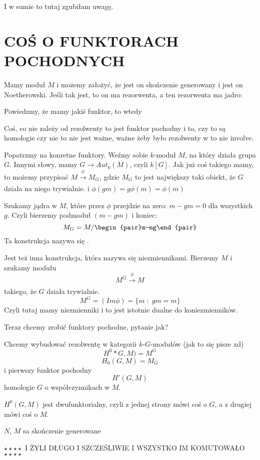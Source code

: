 \documentclass{article}
\begin{document}
I w sumie to tutaj zgubiłam uwagę.


\section*{COŚ O FUNKTORACH POCHODNYCH}

Mamy moduł $M$ i możemy założyć, że jest on skończenie generowany i jest on Noetherowski. Jeśli tak jest, to on ma rezorwenta, a ten rezorwenta ma jadro:

Powiedzmy, że mamy jakiś funktor, to wtedy


Coś, co nie zależy od rezolwenty to jest funktor pochodny i to, czy to są homologie czy nie to nie jest ważne, ważne żeby było rezolwenty w to nie involve.

Popatrzmy na konretne funktory. Weźmy sobie $k$-moduł $M$, na który działa grupa $G$. Innymi słowy, mamy $G\to Aut_k(M)$, czyli $k[G]$.
Jak już coś takiego mamy, to możemy przypisać
$M\xrightarrow[]{\phi} M_G$, gdzie $M_G$ to jest największy taki obiekt, że $G$ działa na niego trywialnie. i $\phi(gm)=g\phi(m)=\phi(m)$

Szukamy jądra w $M$, które przez $\phi$ przejdzie na zero: $m-gm=0$ dla wszystkich $g$. Czyli bierzemy podmoduł $(m-gm)$ i koniec:
$$M_G=M/\begin{pair}m-mg\end{pair}$$
Ta konstrukcja nazywa się .

Jest też inna konstrukcja, która nazywa się niezmiennikami. Bierzemy $M$ i szukamy modułu 
$$M^G\xrightarrow[]{\phi}M$$ 
takiego, że $G$ działa trywialnie. 
$$M^G=(Im\phi)=\{m\;:\;gm=m\}$$
Czyli tutaj mamy niezmienniki i to jest istotnie dualne do koniezmienników.
\medskip

Teraz chcemy zrobić funktory pochodne, pytanie jak?

Chcemy wybudować rezolwentę w kategorii $k$-$G$-modułów (jak to się pisze xd)
$$H^0*G, M)=M^G$$
$$H_0(G, M)=M_G$$
i pierwszy funktor pochodny
$$H'(G, M)$$
homologie $G$ o współczynnikach w $M$.

$H^0(G, M)$ jest dwufunktorialny, czyli z jednej strony mówi coś o $G$, a z drugiej mówi coś o $M$.


$N$, $M$ sa skończenie generowane

\begin{center}$\star\star\star\star$ I ŻYLI DŁUGO I SZCZEŚLIWIE I WSZYSTKO IM KOMUTOWAŁO $\star\star\star\star$\end{center}
\end{document}
